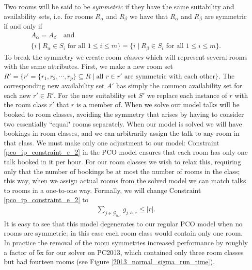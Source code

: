 \documentclass{svjour3}                     %
\begin{document}
Two rooms will be said to be \emph{symmetric} if they have the same suitability and availability sets, i.e. for rooms $R_\alpha$ and $R_\beta$ we have that $R_\alpha$ and $R_\beta$ are symmetric if and only if
\begin{gather*}
	A_\alpha = A_\beta \quad \text{and} \\
	\{i \; | \; R_\alpha \in S_i \text{ for all } 1 \le i \le m\} = \{i \; | \; R_\beta \in S_i \text{ for all } 1 \le i \le m\}.
\end{gather*}
To break the symmetry we create room \emph{classes} which will represent several rooms with the same attributes. 
First, we make a new room set $R' = \{ r'=\{r_1, r_2, \cdots, r_p \}\subseteq R \; | \; \text{all } r \in r' \text{ are symmetric with each other} \}$. 
The corresponding new availability set $A'$ has simply the common availability set for each new $r' \in R'$. 
For the new suitability set $S'$ we replace each instance of $r$ with the room class $r'$ that $r$ is a member of. 
When we solve our model talks will be booked to room classes, avoiding the symmetry that arises by having to consider two essentially ``equal" rooms separately. 
When our model is solved we will have bookings in room classes, and we can arbitrarily assign the talk to any room in that class. 
We must make only one adjustment to our model: Constraint \ref{pco_ip_constraint_e_2} in the PCO model ensures that each room has only one talk booked in it per hour. 
For our room classes we wish to relax this, requiring only that the number of bookings be at most the number of rooms in the class; this way, when we assign actual rooms from the solved model we can match talks to rooms in a one-to-one way. 
Formally, we will change Constraint \ref{pco_ip_constraint_e_2} to
\begin{gather}
	\sum_{j \in \mathcal G_{h,r}} g_{j,h,r} \le |r|.
\end{gather}
It is easy to see that this model degenerates to our regular PCO model when no rooms are symmetric; in this case each room class would contain only one room. 
In practice the removal of the room symmetries increased performance by roughly a factor of 5x for our solver on PC2013, which contained only three room classes but had fourteen rooms (see Figure \ref{2013_normal_sigma_run_time}). 
\end{document}
